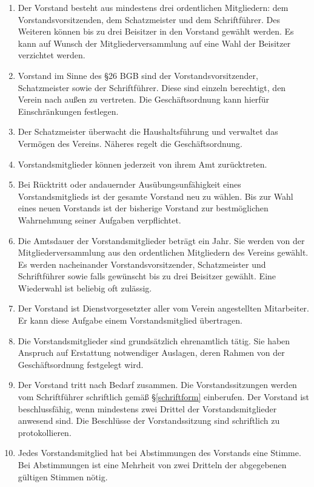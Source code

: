 \documentclass[fontsize=12pt,paper=a4,pagesize]{scrartcl}
\begin{document}
\begin{enumerate}
	\item Der Vorstand besteht aus mindestens drei ordentlichen
		Mitgliedern: dem Vorstandsvorsitzenden, dem Schatzmeister und dem
		Schriftführer. Des Weiteren können bis zu drei Beisitzer in den
		Vorstand gewählt werden. Es kann auf Wunsch der
		Mitgliederversammlung auf eine Wahl der Beisitzer verzichtet werden.

	\item Vorstand im Sinne des §26 BGB sind der Vorstandsvorsitzender,
		Schatzmeister sowie der Schriftführer. Diese sind einzeln
		berechtigt, den Verein nach außen zu vertreten. Die Geschäftsordnung
		kann hierfür Einschränkungen festlegen.

	\item Der Schatzmeister überwacht die Haushaltsführung und verwaltet
		das Vermögen des Vereins. Näheres regelt die Geschäftsordnung.

	\item Vorstandsmitglieder können jederzeit von ihrem Amt zurücktreten.

	\item Bei Rücktritt oder andauernder Ausübungsunfähigkeit eines
		Vorstandsmitglieds ist der gesamte Vorstand neu zu wählen. Bis zur
		Wahl eines neuen Vorstands ist der bisherige Vorstand zur
		bestmöglichen Wahrnehmung seiner Aufgaben verpflichtet.

	\item Die Amtsdauer der Vorstandsmitglieder beträgt ein Jahr. Sie werden
		von der Mitgliederversammlung aus den ordentlichen Mitgliedern des
		Vereins gewählt. Es werden nacheinander Vorstandsvorsitzender,
		Schatzmeister und Schriftführer sowie falls gewünscht bis zu drei
		Beisitzer gewählt. Eine Wiederwahl ist beliebig oft zulässig.

	\item Der Vorstand ist Dienstvorgesetzter aller vom Verein angestellten
		Mitarbeiter. Er kann diese Aufgabe einem Vorstandsmitglied übertragen.

	\item Die Vorstandsmitglieder sind grundsätzlich ehrenamtlich tätig.
		Sie haben Anspruch auf Erstattung notwendiger Auslagen, deren Rahmen
		von der Geschäftsordnung festgelegt wird.

	\item Der Vorstand tritt nach Bedarf zusammen. Die Vorstandssitzungen
		werden vom Schriftführer schriftlich gemäß §\ref{schriftform} einberufen. Der Vorstand
		ist beschlussfähig, wenn mindestens zwei Drittel der Vorstandsmitglieder
		anwesend sind. Die Beschlüsse der Vorstandssitzung sind schriftlich zu
		protokollieren.

	\item Jedes Vorstandsmitglied hat bei Abstimmungen des Vorstands eine
		Stimme. Bei Abstimmungen ist eine Mehrheit von zwei Dritteln der
		abgegebenen gültigen Stimmen nötig.
\end{enumerate}
\end{document}

